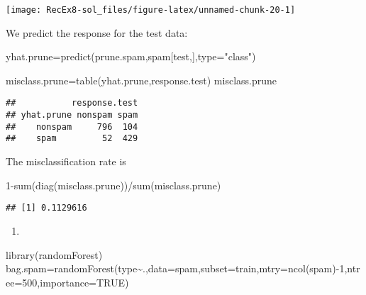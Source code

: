 \documentclass[
]{article}
\newenvironment{Shaded}{\begin{snugshade}}{\end{snugshade}}
\newcommand{\AttributeTok}[1]{\textcolor[rgb]{0.77,0.63,0.00}{#1}}
\newcommand{\ConstantTok}[1]{\textcolor[rgb]{0.00,0.00,0.00}{#1}}
\newcommand{\DecValTok}[1]{\textcolor[rgb]{0.00,0.00,0.81}{#1}}
\newcommand{\FunctionTok}[1]{\textcolor[rgb]{0.00,0.00,0.00}{#1}}
\newcommand{\NormalTok}[1]{#1}
\newcommand{\OtherTok}[1]{\textcolor[rgb]{0.56,0.35,0.01}{#1}}
\newcommand{\SpecialCharTok}[1]{\textcolor[rgb]{0.00,0.00,0.00}{#1}}
\newcommand{\StringTok}[1]{\textcolor[rgb]{0.31,0.60,0.02}{#1}}
\providecommand{\tightlist}{%
  \setlength{\itemsep}{0pt}\setlength{\parskip}{0pt}}
\begin{document}
\texttt{[image: RecEx8-sol\_files/figure-latex/unnamed-chunk-20-1]}

We predict the response for the test data:

\begin{Shaded}
\begin{Highlighting}[]
\NormalTok{yhat.prune}\OtherTok{=}\FunctionTok{predict}\NormalTok{(prune.spam,spam[test,],}\AttributeTok{type=}\StringTok{"class"}\NormalTok{)}

\NormalTok{misclass.prune}\OtherTok{=}\FunctionTok{table}\NormalTok{(yhat.prune,response.test)}
\NormalTok{misclass.prune}
\end{Highlighting}
\end{Shaded}

\begin{verbatim}
##           response.test
## yhat.prune nonspam spam
##    nonspam     796  104
##    spam         52  429
\end{verbatim}

The misclassification rate is

\begin{Shaded}
\begin{Highlighting}[]
\DecValTok{1}\SpecialCharTok{{-}}\FunctionTok{sum}\NormalTok{(}\FunctionTok{diag}\NormalTok{(misclass.prune))}\SpecialCharTok{/}\FunctionTok{sum}\NormalTok{(misclass.prune)}
\end{Highlighting}
\end{Shaded}

\begin{verbatim}
## [1] 0.1129616
\end{verbatim}

\begin{enumerate}
\def\labelenumi{\alph{enumi})}
\setcounter{enumi}{5}
\tightlist
\item
\end{enumerate}

\begin{Shaded}
\begin{Highlighting}[]
\FunctionTok{library}\NormalTok{(randomForest)}
\NormalTok{bag.spam}\OtherTok{=}\FunctionTok{randomForest}\NormalTok{(type}\SpecialCharTok{\textasciitilde{}}\NormalTok{.,}\AttributeTok{data=}\NormalTok{spam,}\AttributeTok{subset=}\NormalTok{train,}\AttributeTok{mtry=}\FunctionTok{ncol}\NormalTok{(spam)}\SpecialCharTok{{-}}\DecValTok{1}\NormalTok{,}\AttributeTok{ntree=}\DecValTok{500}\NormalTok{,}\AttributeTok{importance=}\ConstantTok{TRUE}\NormalTok{)}
\end{Highlighting}
\end{Shaded}
\end{document}
